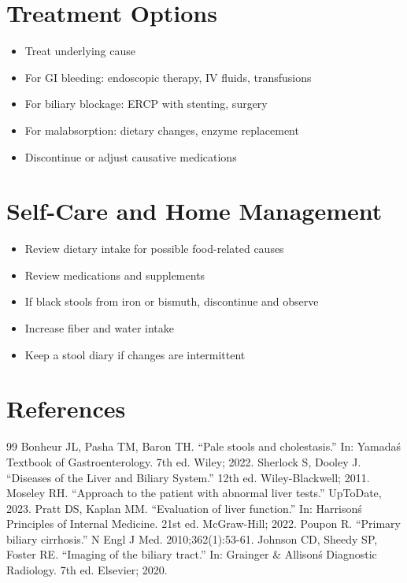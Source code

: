 \section*{Treatment Options}
\begin{itemize}
\item Treat underlying cause
\item For GI bleeding: endoscopic therapy, IV fluids, transfusions
\item For biliary blockage: ERCP with stenting, surgery
\item For malabsorption: dietary changes, enzyme replacement
\item Discontinue or adjust causative medications
\end{itemize}

\section*{Self-Care and Home Management}
\begin{itemize}
\item Review dietary intake for possible food-related causes
\item Review medications and supplements
\item If black stools from iron or bismuth, discontinue and observe
\item Increase fiber and water intake
\item Keep a stool diary if changes are intermittent
\end{itemize}

\section*{References}
\begin{thebibliography}{99}
 Bonheur JL, Pasha TM, Baron TH. ``Pale stools and cholestasis.'' In: Yamada\'s Textbook of Gastroenterology. 7th ed. Wiley; 2022.
 Sherlock S, Dooley J. ``Diseases of the Liver and Biliary System.'' 12th ed. Wiley-Blackwell; 2011.
 Moseley RH. ``Approach to the patient with abnormal liver tests.'' UpToDate, 2023.
 Pratt DS, Kaplan MM. ``Evaluation of liver function.'' In: Harrison\'s Principles of Internal Medicine. 21st ed. McGraw-Hill; 2022.
 Poupon R. ``Primary biliary cirrhosis.'' N Engl J Med. 2010;362(1):53-61.
 Johnson CD, Sheedy SP, Foster RE. ``Imaging of the biliary tract.'' In: Grainger \& Allison\'s Diagnostic Radiology. 7th ed. Elsevier; 2020.
\end{thebibliography}
